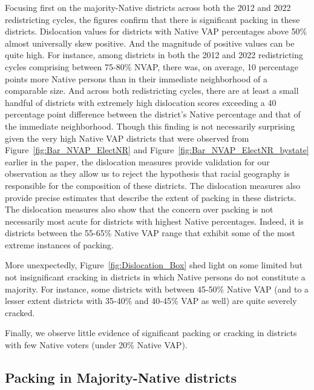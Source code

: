 \documentclass[12pt]{article}
\begin{document}
Focusing first on the majority-Native districts across both the 2012 and 2022 redistricting cycles, the figures confirm that there is significant packing in these districts.  Dislocation values for districts with Native VAP percentages above 50\% almost universally skew positive.  And the magnitude of positive values can be quite high.  For instance, among districts in both the 2012 and 2022 redistricting cycles comprising between 75-80\% NVAP, there was, on average, 10 percentage points more Native persons than in their immediate neighborhood of a comparable size.  And across both redistricting cycles, there are at least a small handful of districts with extremely high dislocation scores exceeding a 40 percentage point difference between the district's Native percentage and that of the immediate neighborhood.  Though this finding is not necessarily surprising given the very high Native VAP districts that were observed from Figure~\ref{fig:Bar_NVAP_ElectNR} and Figure~\ref{fig:Bar_NVAP_ElectNR_bystate} earlier in the paper, the dislocation measures provide validation for our observation as they allow us to reject the hypothesis that racial geography is responsible for the composition of these districts.  The dislocation measures also provide precise estimates that describe the extent of packing in these districts.  The dislocation measures also show that the concern over packing is not necessarily most acute for districts with highest Native percentages.  Indeed, it is districts between the 55-65\% Native VAP range that exhibit some of the most extreme instances of packing.

More unexpectedly, Figure~\ref{fig:Dislocation_Box} shed light on some limited but not insignificant cracking in districts in which Native persons do not constitute a majority.  For instance, some districts with between 45-50\% Native VAP (and to a lesser extent districts with 35-40\% and 40-45\% VAP as well) are quite severely cracked.

Finally, we observe little evidence of significant packing or cracking in districts with few Native voters (under 20\% Native VAP).

\subsection{Packing in Majority-Native districts}
\end{document}
